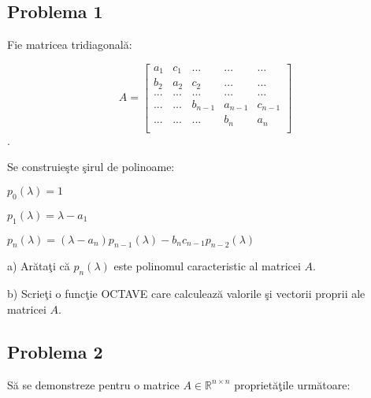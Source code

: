 \documentclass{exam}
\begin{document}


\subsection{Problema 1}
Fie matricea tridiagonală:

$$A = \begin{bmatrix} a_{1} & c_{1} & ...     & ...     & ...     \\
                b_{2} & a_{2} & c_{2}   & ...     & ...     \\
                ...   & ...   & ...     & ...     & ...     \\
                ...   & ...   & b_{n-1} & a_{n-1} & c_{n-1} \\
                ...   & ...   & ...     & b_{n}   & a_{n}   \\
	\end{bmatrix}$$.

Se construieşte şirul de polinoame:

$p_{0} ( \lambda ) = 1$

$p_{1} ( \lambda ) = \lambda - a_{1} $

$p_{n} ( \lambda ) = ( \lambda - a_{n} ) p_{n-1} ( \lambda ) - b_{n} c_{n-1} p_{n-2} ( \lambda )$

a) Arătaţi că $p_{n} ( \lambda )$ este polinomul caracteristic al matricei $A$.

b) Scrieţi o funcţie OCTAVE care calculează valorile şi vectorii proprii ale matricei $A$.


\subsection{Problema 2}

Să se demonstreze pentru o matrice $A \in \mathbb{R}^{n \times n}$ proprietăţile următoare:
\end{document}
